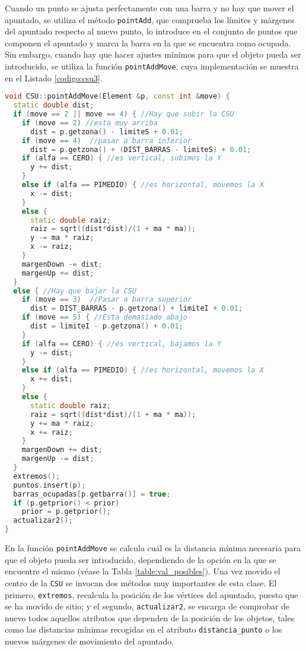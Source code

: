 Cuando un punto se ajusta perfectamente con una barra y no hay que mover el apuntado,
se utiliza el método \texttt{pointAdd}, que comprueba los límites y márgenes
del apuntado respecto al nuevo punto, lo introduce en el conjunto de puntos que
componen el apuntado y marca la barra en la que se encuentra como ocupada. Sin
embargo, cuando hay que hacer ajustes mínimos para que el objeto pueda ser
introducido, se utiliza la función \texttt{pointAddMove}, cuya implementación se
muestra en el Listado \ref{codigo:csu3}.

\begin{lstlisting}[float=tpb,
                   language=C++,basicstyle=\ttfamily\footnotesize,
                   caption={Método que añade un punto que requiere de ciertos ajustes},
                   label={codigo:csu3}]
void CSU::pointAddMove(Element &p, const int &move) {
  static double dist;
  if (move == 2 || move == 4) { //Hay que subir la CSU
    if (move == 2) //esta muy arriba
      dist = p.getzona() - limiteS + 0.01;
    if (move == 4)  //pasar a barra inferior
      dist = p.getzona() + (DIST_BARRAS - limiteS) + 0.01;
    if (alfa == CERO) { //es vertical, subimos la Y
      y += dist;
    }
    else if (alfa == PIMEDIO) { //es horizontal, movemos la X
      x -= dist;
    }
    else {
      static double raiz;
      raiz = sqrt((dist*dist)/(1 + ma * ma));
      y -= ma * raiz;
      x -= raiz;
    }
    margenDown -= dist;
    margenUp += dist;
  }
  else { //Hay que bajar la CSU
    if (move == 3)  //Pasar a barra superior 
      dist = DIST_BARRAS - p.getzona() + limiteI + 0.01;
    if (move == 5) { //Esta demasiado abajo
      dist = limiteI - p.getzona() + 0.01;
    }
    if (alfa == CERO) { //es vertical, bajamos la Y
      y -= dist;
    }
    else if (alfa == PIMEDIO) { //es horizontal, movemos la X
      x += dist;
    }
    else {
      static double raiz;
      raiz = sqrt((dist*dist)/(1 + ma * ma));
      y += ma * raiz;
      x += raiz;
    }
    margenDown += dist;
    margenUp -= dist;
  }
  extremos();
  puntos.insert(p);
  barras_ocupadas[p.getbarra()] = true;
  if (p.getprior() < prior)
    prior = p.getprior();
  actualizar2();
}
\end{lstlisting}

En la función \texttt{pointAddMove} se calcula cuál es la distancia mínima necesaria para que el
objeto pueda ser introducido, dependiendo de la opción en la que se encuentre el
mismo (véase la Tabla \ref{table:val_posibles}). Una vez movido el centro de la
\texttt{CSU} se invocan dos métodos muy importantes de esta clase. El primero,
\texttt{extremos}, recalcula la posición de los vértices del apuntado, puesto
que se ha movido de sitio; y el segundo, \texttt{actualizar2}, se encarga de
comprobar de nuevo todos aquellos atributos que dependen de la posición de los
objetos, tales como las distancias mínimas recogidas en el atributo
\texttt{distancia\_punto} o los nuevos márgenes de movimiento del apuntado.

